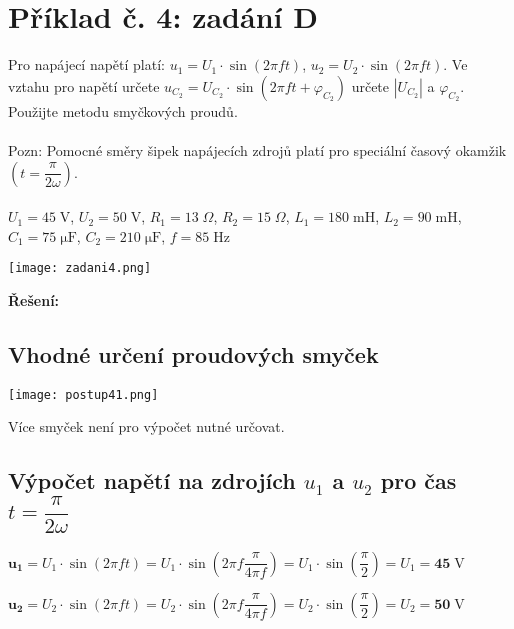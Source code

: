 \documentclass[a4paper,12pt]{article}
\begin{document}
\section{Příklad č. 4: zadání D}
Pro napájecí napětí platí: $u_1 = U_1 \cdot \sin (2\pi ft)$, $u_2 = U_2 \cdot \sin (2\pi ft)$. Ve vztahu pro napětí   určete $u_{C_2} = U_{C_2} \cdot \sin (2\pi ft+\varphi_{C_2})$ určete $| U_{C_2}|$ a $\varphi_{C_2}$. Použijte metodu smyčkových proudů.\\
\\
Pozn: Pomocné směry šipek napájecích zdrojů platí pro speciální časový okamžik $(t=\dfrac{\pi}
{2\omega})$.\\
\\
$U_1=45\;\si{\volt}$, $U_2=50\;\si{\volt}$, $R_1=13\;\si{\Omega}$, $R_2=15\;\si{\Omega}$, $L_1=180\;\si{\milli\henry}$, $L_2=90\;\si{\milli\henry}$, $C_1=75\;\si{\micro\farad}$, $C_2=210\;\si{\micro\farad}$, $f=85\;\si{\hertz}$\par
\vspace{1.5em}
\begin{center}
\texttt{[image: zadani4.png]}
\vspace{-75pt}
\end{center}
\newpage
\textbf{\large Řešení:}
\vspace{-1.2em}
\subsection{Vhodné určení proudových smyček}\par
\begin{center}
\texttt{[image: postup41.png]}
\end{center}
Více smyček není pro výpočet nutné určovat.\par
\subsection{Výpočet napětí na zdrojích $u_1$ a $u_2$ pro čas $t=\dfrac{\pi}{2\omega}$}\par
$\mathbf{u_1} = U_1 \cdot \sin (2\pi ft)=U_1 \cdot \sin (2\pi f\dfrac{\pi}{4\pi f})=U_1 \cdot \sin (\dfrac{\pi}{2})=U_1=\mathbf{45}\;\si{\volt}$\par
$\mathbf{u_2} = U_2 \cdot \sin (2\pi ft)=U_2 \cdot \sin (2\pi f\dfrac{\pi}{4\pi f})=U_2 \cdot \sin (\dfrac{\pi}{2})=U_2=\mathbf{50}\;\si{\volt}$\par
\end{document}
